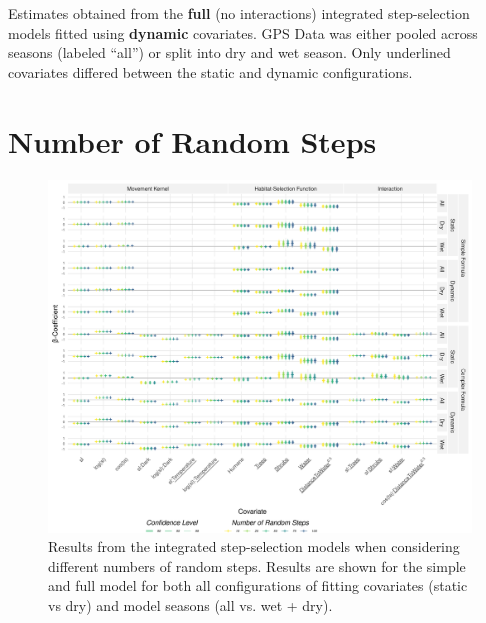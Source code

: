 \documentclass[abstract=on,10pt,a4paper,bibliography=totocnumbered]{article}
\newcommand{\inputy}[1]{\unskip}
\begin{document}
\begin{table}[htbp]
 \begin{center}
  \caption{Estimates obtained from the \textbf{full} (no interactions)
  integrated step-selection models fitted using \textbf{dynamic} covariates. GPS
  Data was either pooled across seasons (labeled ``all'') or split into dry and
  wet season. Only underlined covariates differed between the static and dynamic
  configurations.}
  \label{ModelsDynamicFull}
   \begin{threeparttable}
   \inputy{Figures/MovementModelDynamicFull.tex}
   \end{threeparttable}
 \end{center}
\end{table}

\newpage
\section{Number of Random Steps}

\begin{figure}[htbp]
 \begin{center}
  \includegraphics[width = \textwidth]{Figures/Stability.png}
  \caption{Results from the integrated step-selection models when considering
  different numbers of random steps. Results are shown for the simple and full
  model for both all configurations of fitting covariates (static vs dry) and
  model seasons (all vs. wet + dry).}
  \label{Stability}
 \end{center}
\end{figure}
\end{document}
